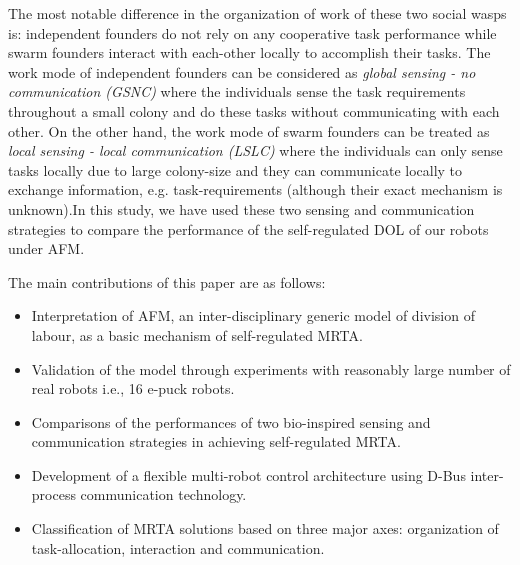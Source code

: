 \documentclass[preprint,12pt]{elsarticle}
\begin{document}
The most notable difference in the organization of work of these two social wasps is: independent founders do not rely on any cooperative task performance while swarm founders interact with each-other locally to accomplish their tasks. The work mode of independent founders can be considered as {\em global sensing - no communication (GSNC)} where the individuals sense the task requirements throughout a small colony and do these tasks without communicating with each other. On the other hand, the work mode of swarm founders can be treated as {\em local sensing - local communication (LSLC)} where the individuals can only sense tasks locally due to large colony-size and they can communicate locally to exchange information, e.g. task-requirements (although their exact mechanism is unknown).In this study, we have used these two sensing and communication strategies to compare the performance of the self-regulated DOL of our robots under AFM. 

The main contributions of this paper are as follows:
\begin{itemize}
\item Interpretation of AFM, an inter-disciplinary generic model of division of labour, as a basic mechanism of self-regulated MRTA.
\item Validation of the model through experiments with reasonably large number of real robots i.e., 16 e-puck robots.
\item Comparisons of the performances of two bio-inspired sensing and communication strategies in achieving self-regulated MRTA.
\item Development of a flexible multi-robot control architecture using D-Bus inter-process communication technology.
\item Classification of MRTA solutions based on three major axes: organization of task-allocation, interaction and communication.
\end{itemize}
\end{document}
